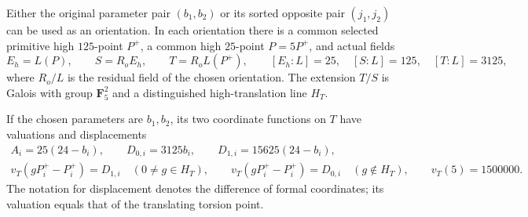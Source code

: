 \begin{lemma}
\label{lem:B-RD96-selected}
Either the original parameter pair $(b_1,b_2)$ or its sorted opposite
pair $(j_1,j_2)$ can be used as an orientation. In each orientation
there is a common selected primitive high $125$-point $P^+$, a common
high $25$-point $P=5P^+$, and actual fields
\[
 E_h=L(P),\qquad S=R_oE_h,\qquad T=R_oL(P^+),
 \qquad [E_h:L]=25,\quad[S:L]=125,\quad[T:L]=3125,
                                                        \tag{B-RD96.1}
\]
where $R_o/L$ is the residual field of the chosen orientation.
The extension $T/S$ is Galois with group $\mathbf F_5^2$ and a
distinguished high-translation line $H_T$.

If the chosen parameters are $b_1,b_2$, its two coordinate functions
on $T$ have valuations and displacements
\[
\begin{gathered}
 A_i=25(24-b_i),\qquad
 D_{0,i}=3125b_i,\qquad D_{1,i}=15625(24-b_i),\\
 v_T(gP_i^+-P_i^+)=D_{1,i}\quad(0\ne g\in H_T),\qquad
 v_T(gP_i^+-P_i^+)=D_{0,i}\quad(g\notin H_T),\qquad
 v_T(5)=1500000.
                                                        \tag{B-RD96.2}
\end{gathered}
\]
The notation for displacement denotes the difference of formal
coordinates; its valuation equals that of the translating torsion
point.
\end{lemma}
